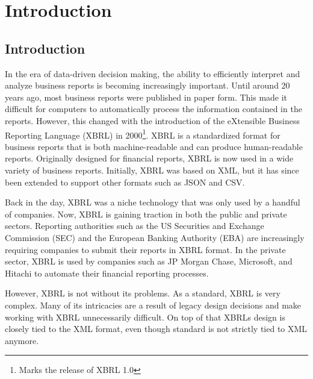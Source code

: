 \chapter{Introduction}
\label{sec:introduction}

\section{Introduction}


In the era of data-driven decision making, the ability to efficiently interpret and analyze business reports is becoming increasingly important.
Until around 20 years ago, most business reports were published in paper form.
This made it difficult for computers to automatically process the information contained in the reports.
However, this changed with the introduction of the eXtensible Business Reporting Language (XBRL) in 2000\cite{aicpa_xbrl_story}\footnote{Marks the release of XBRL 1.0}.
XBRL is a standardized format for business reports that is both machine-readable and can produce human-readable reports.
Originally designed for financial reports, XBRL is now used in a wide variety of business reports.\cite{xbrl_about}
Initially, XBRL was based on XML, but it has since been extended to support other formats such as JSON and CSV.

Back in the day, XBRL was a niche technology that was only used by a handful of companies.
Now, XBRL is gaining traction in both the public and private sectors.
Reporting authorities such as the US Securities and Exchange Commission (SEC) and the European Banking Authority (EBA)\cite{eba_reporting_frameworks} are increasingly requiring companies to submit their reports in XBRL format.\cite{sec_ixbrl}
In the private sector, XBRL is used by companies such as JP Morgan Chase, Microsoft, and Hitachi to automate their financial reporting processes.\cite{pwc2002thejournal}

However, XBRL is not without its problems.
As a standard, XBRL is very complex.
Many of its intricacies are a result of legacy design decisions and make working with XBRL unnecessarily difficult.
On top of that XBRLs design is closely tied to the XML format, even though standard is not strictly tied to XML anymore.

